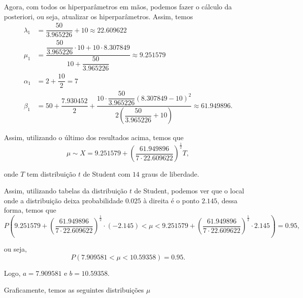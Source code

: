 \documentclass{article}
\begin{document}
Agora, com todos os hiperparâmetros em mãos, podemos fazer o cálculo da posteriori, ou seja, atualizar os hiperparâmetros. Assim, temos
\begin{equation*}
    \begin{split}
        \lambda_1 & = \dfrac{50}{3.965226} + 10 \approx 22.609622 \\
        \mu_1 & = \dfrac{\dfrac{50}{3.965226}\cdot 10 + 10\cdot 8.307849}{10 + \dfrac{50}{3.965226}} \approx 9.251579 \\
        \alpha_1 & = 2 + \dfrac{10}{2} = 7 \\
        \beta_1 & = 50 + \dfrac{7.930452}{2} + \dfrac{10\cdot \dfrac{50}{3.965226}\left(8.307849 - 10\right)^2}{2\left(\dfrac{50}{3.965226} + 10\right)} \approx 61.949896.
    \end{split}
\end{equation*}

Assim, utilizando o último dos resultados acima, temos que
\[\mu \sim X = 9.251579 + \left(\dfrac{61.949896}{7\cdot 22.609622}\right)^{\frac{1}{2}}T,\]

\noindent onde $T$ tem distribuição $t$ de Student com $14$ graus de liberdade.

Assim, utilizando tabelas da distribuição $t$ de Student, podemos ver que o local onde a distribuição deixa probabilidade $0.025$ à direita é o ponto $2.145$, dessa forma, temos que
\[P\left(9.251579 + \left(\dfrac{61.949896}{7\cdot 22.609622}\right)^{\frac{1}{2}}\cdot (-2.145) < \mu < 9.251579 + \left(\dfrac{61.949896}{7\cdot 22.609622}\right)^{\frac{1}{2}}\cdot 2.145\right) = 0.95,\]

\noindent ou seja,
\[P\left(7.909581 < \mu < 10.59358\right) = 0.95.\]

Logo, $a = 7.909581$ e $b = 10.59358$.

Graficamente, temos as seguintes distribuições $\mu$
\end{document}
